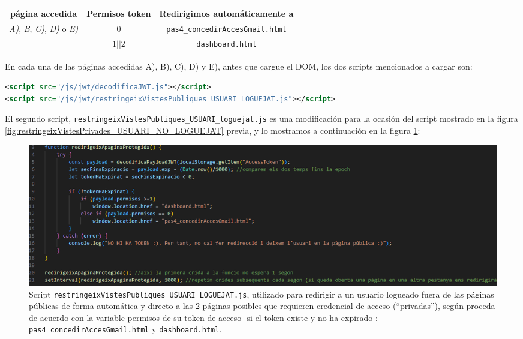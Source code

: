 \documentclass[a4paper,12pt]{report}
\begin{document}
	\begin{table}[h!]
		\centering
		\begin{tabular}{|c|c|c|}
			\hline
			\textbf{página accedida} & \textbf{Permisos token} & \textbf{Redirigimos automáticamente a} \\
			\hline
			\multirow{2}{*}{\textit{A)}, \textit{B}, \textit{C)}, \textit{D)} o \textit{E)}} & $0$ & \texttt{pas4\_concedirAccesGmail.html} \\
			& $1 || 2$ & \texttt{dashboard.html} \\
			\hline
		\end{tabular}
	\end{table}

	En cada una de las páginas accedidas A), B), C), D) y E), antes que cargue el DOM, los dos scripts mencionados a cargar son:
	
\begin{lstlisting}[language=xml, basicstyle=\ttfamily\footnotesize, keywordstyle=\color{magenta}]
<script src="/js/jwt/decodificaJWT.js"></script>
<script src="/js/jwt/restringeixVistesPubliques_USUARI_LOGUEJAT.js"></script>
\end{lstlisting}

El segundo script, \texttt{restringeixVistesPubliques\_USUARI\_loguejat.js} es una modificación para la ocasión del script mostrado en la figura \ref{fig:restringeixVistesPrivades_USUARI_NO_LOGUEJAT} previa, y lo mostramos a continuación en la figura \ref{fig:restringeixVistesPubliquesUSUARILOGUEJAT}:


\setlength{\belowcaptionskip}{3pt}
\FloatBarrier
\begin{figure}[H]
	\centering
	\caption{Script \texttt{restringeixVistesPubliques\_USUARI\_LOGUEJAT.js}, utilizado para redirigir a un usuario logueado fuera de las páginas públicas de forma automática y directo a las 2 páginas posibles que requieren credencial de acceso (``privadas''), según proceda de acuerdo con la variable permisos de su token de acceso -si el token existe y no ha expirado-: \texttt{pas4\_concedirAccesGmail.html} y \texttt{dashboard.html}.}
	\includegraphics[width=1\linewidth]{img/restringeixVistesPubliques_USUARI_LOGUEJAT.png}
	
	\label{fig:restringeixVistesPubliquesUSUARILOGUEJAT}
\end{figure}
\FloatBarrier	
	
\end{document}
